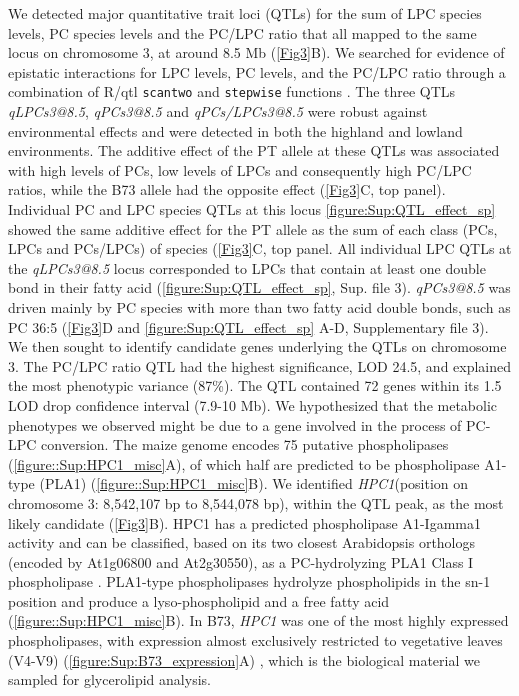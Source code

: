 \documentclass[9pt,twocolumn,twoside,lineno]{biorxiv}
\def\code#1{\texttt{#1}}
\newcommand{\hpc}{\textit{HPC1}\xspace}
\begin{document}
We detected major quantitative trait loci (QTLs) for the sum of LPC species levels, PC species levels and the PC/LPC ratio that all mapped to the same locus on chromosome 3, at around 8.5 Mb (\cref{Fig3}B). 
We searched for evidence of epistatic interactions for LPC levels, PC levels, and the PC/LPC ratio through a combination of R/qtl \code{scantwo} and \code{stepwise} functions \cite{Broman2003-ac}.
The three QTLs \textit{qLPCs3@8.5}, \textit{qPCs3@8.5} and \textit{qPCs/LPCs3@8.5} were robust against environmental effects and were detected in both the highland and lowland environments.
The additive effect of the PT allele at these QTLs was associated with high levels of PCs, low levels of LPCs and consequently high PC/LPC ratios, while the B73 allele had the opposite effect (\cref{Fig3}C, top panel).
Individual PC and LPC species QTLs  at this locus \cref{figure:Sup:QTL_effect_sp} showed the same additive effect for the PT allele as the sum of each class (PCs, LPCs and PCs/LPCs) of species (\cref{Fig3}C, top panel. 
All individual LPC QTLs at the \textit{qLPCs3@8.5} locus corresponded to LPCs that contain at least one double bond in their fatty acid (\cref{figure:Sup:QTL_effect_sp}, Sup. file 3).
\textit{qPCs3@8.5} was driven mainly by PC species with more than two fatty acid double bonds, such as PC 36:5 (\cref{Fig3}D and \cref{figure:Sup:QTL_effect_sp} A-D, Supplementary file 3).
We then sought to identify candidate genes underlying the QTLs on chromosome 3.
The PC/LPC ratio QTL had the highest significance, LOD 24.5, and explained the most phenotypic variance (87\%). 
The QTL contained 72 genes within its 1.5 LOD drop confidence interval (7.9-10 Mb). 
We hypothesized that the metabolic phenotypes we observed might be due to a gene involved in the process of PC-LPC conversion.  
The maize genome encodes 75 putative phospholipases (\cref{figure::Sup:HPC1_misc}A), of which half are predicted to be phospholipase A1-type (PLA1) (\cref{figure::Sup:HPC1_misc}B).  
We identified \hpc (position on chromosome 3: 8,542,107 bp to 8,544,078 bp), within the QTL peak, as the most likely candidate (\cref{Fig3}B). 
HPC1 has a predicted phospholipase A1-Igamma1 activity and can be classified, based on its two closest Arabidopsis orthologs (encoded by At1g06800 and At2g30550), as a PC-hydrolyzing PLA1 Class I phospholipase \cite{Ryu2004-iv}. 
PLA1-type phospholipases hydrolyze phospholipids in the sn-1 position and produce a lyso-phospholipid and a free fatty acid (\cref{figure::Sup:HPC1_misc}B). 
In B73, \hpc was one of the most highly expressed phospholipases, with expression almost exclusively restricted to vegetative leaves (V4-V9) (\cref{figure:Sup:B73_expression}A) \cite{Stelpflug2016-vr}, which is the biological material we sampled for glycerolipid analysis. 
\end{document}

